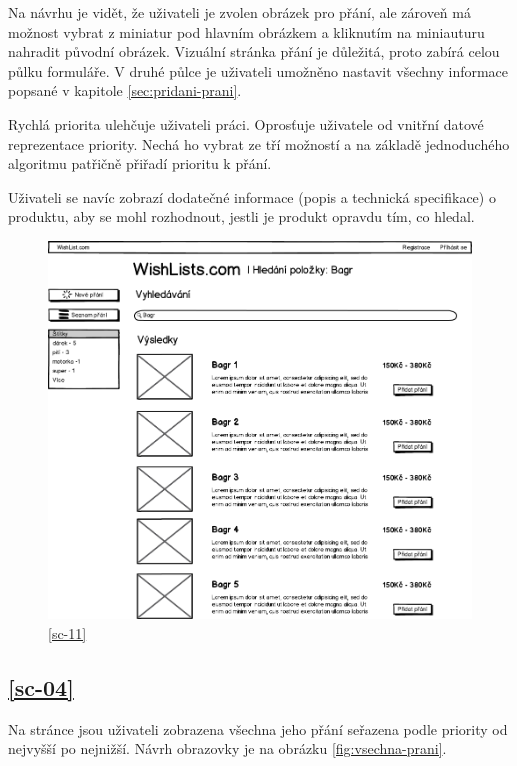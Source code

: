 Na návrhu je vidět, že uživateli je zvolen obrázek pro přání, ale zároveň má možnost vybrat z miniatur pod hlavním obrázkem a kliknutím na miniauturu nahradit původní obrázek. Vizuální stránka přání je důležitá, proto zabírá celou půlku formuláře. V druhé půlce je uživateli umožněno nastavit všechny informace popsané v kapitole \ref{sec:pridani-prani}.

Rychlá priorita ulehčuje uživateli práci. Oprosťuje uživatele od vnitřní datové reprezentace priority. Nechá ho vybrat ze tří možností a na základě jednoduchého algoritmu patřičně přiřadí prioritu k přání.

Uživateli se navíc zobrazí dodatečné informace (popis a technická specifikace) o produktu, aby se mohl rozhodnout, jestli je produkt opravdu tím, co hledal.

\begin{figure}[htb]
\begin{center}
\includegraphics[width=130mm]{./pictures/mock/vysledky-hledani.png}
\caption{\ref{sc-11}}
\label{fig:formular-pridani-prani}
\end{center}
\end{figure}

\subsection{\ref{sc-04}}
Na stránce jsou uživateli zobrazena všechna jeho přání seřazena podle priority od nejvyšší po nejnižší. Návrh obrazovky je na obrázku \ref{fig:vsechna-prani}.

